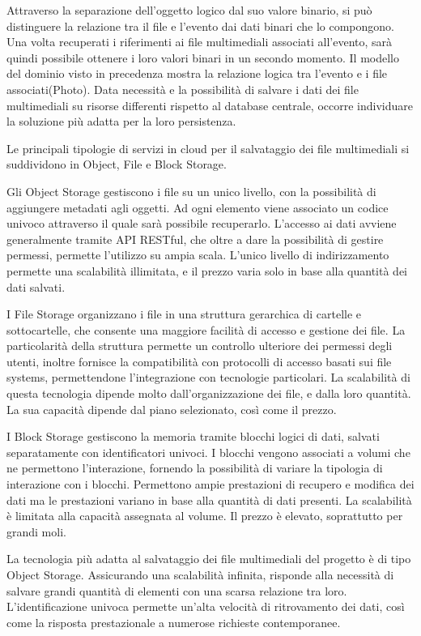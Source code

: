 Attraverso la separazione dell'oggetto logico dal suo valore binario, si può distinguere la relazione tra il file e l'evento dai dati binari che lo compongono. Una volta recuperati i riferimenti ai file multimediali associati all’evento, sarà quindi possibile ottenere i loro valori binari in un secondo momento. Il modello del dominio visto in precedenza mostra la relazione logica tra l’evento e i file associati(Photo).
Data necessità e la possibilità di salvare i dati dei file multimediali su risorse differenti rispetto al database centrale, occorre individuare la soluzione più adatta per la loro persistenza.

Le principali tipologie di servizi in cloud per il salvataggio dei file multimediali si suddividono in Object, File e Block Storage.

Gli Object Storage gestiscono i file su un unico livello, con la possibilità di aggiungere metadati agli oggetti.  Ad ogni elemento viene associato un codice univoco attraverso il quale sarà possibile recuperarlo. L’accesso ai dati avviene generalmente tramite API RESTful, che oltre a dare la possibilità di gestire permessi, permette l’utilizzo su ampia scala. L’unico livello di indirizzamento permette una scalabilità illimitata, e il prezzo varia solo in base alla quantità dei dati salvati. 

I File Storage organizzano i file in una struttura gerarchica di cartelle e sottocartelle, che consente una maggiore facilità di accesso e gestione dei file. La particolarità della struttura permette un controllo ulteriore dei permessi degli utenti, inoltre fornisce la compatibilità con protocolli di accesso basati sui file systems, permettendone l’integrazione con tecnologie particolari. La scalabilità di questa tecnologia dipende molto dall’organizzazione dei file, e dalla loro quantità. La sua capacità dipende dal piano selezionato, così come il prezzo.


I Block Storage gestiscono la memoria tramite blocchi logici di dati, salvati separatamente con identificatori univoci. I blocchi vengono associati a volumi che ne permettono l’interazione, fornendo la possibilità di variare la tipologia di interazione con i blocchi. Permettono ampie prestazioni di recupero e modifica dei dati ma le prestazioni variano in base alla quantità di dati presenti. La scalabilità è limitata alla capacità assegnata al volume. Il prezzo è elevato, soprattutto per grandi moli. 

La tecnologia più adatta al salvataggio dei file multimediali del progetto è di tipo Object Storage. Assicurando una scalabilità infinita, risponde alla necessità di salvare grandi quantità di elementi con una scarsa relazione tra loro. L’identificazione univoca permette un'alta velocità di ritrovamento dei dati, così come la risposta prestazionale a numerose richieste contemporanee.

